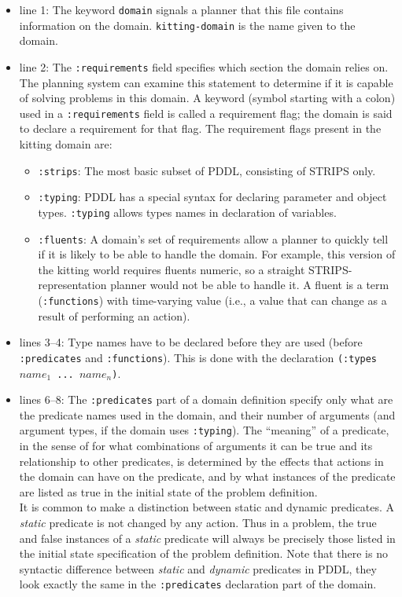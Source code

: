 \begin{itemize}
\item line 1: The keyword \texttt{domain} signals a planner that this file contains information on the domain. \texttt{kitting-domain} is the name given to the domain.
\item line 2: The \texttt{:requirements} field specifies which section the domain relies on. The planning system can examine this statement to determine if it is capable of solving problems in this domain. A keyword (symbol starting with a colon) used in a \texttt{:requirements} field is called a requirement flag; the domain is said to declare a requirement for that flag. The requirement flags present in the kitting domain are:
\begin{itemize}
\item \texttt{:strips}: The most basic subset of PDDL, consisting of STRIPS only.
\item \texttt{:typing}: PDDL has a special syntax for declaring parameter and object types. \texttt{:typing} allows types names in declaration of variables.
\item \texttt{:fluents}: A domain's set of requirements allow a planner to quickly tell if it is likely to be able
to handle the domain. For example, this version of the kitting world requires fluents numeric, so a straight STRIPS-representation planner would not be able to handle it. A fluent is a term (\texttt{:functions}) with time-varying value (i.e., a value that can change as a result of performing an action).
\end{itemize}
\item lines 3--4:  Type names have to be declared before they are used (before \texttt{:predicates} and \texttt{:functions}). This is done with the declaration \texttt{(:types $name_1$ ... $name_n$)}.
\item lines 6--8: The \texttt{:predicates} part of a domain definition specify only what are the predicate names used in the domain, and their number of arguments (and argument types, if the domain uses \texttt{:typing}). The ``meaning'' of a predicate, in the sense of for what combinations of arguments it can be true and its relationship to other predicates, is determined by the effects that actions in the domain can have on the predicate, and by what instances of the predicate are listed as true in the initial state of the problem definition.\\
    It is common to make a distinction between static and dynamic predicates. A \textit{static} predicate is not changed by any action. Thus in a problem, the true and false instances of a \textit{static} predicate will always be precisely those listed in the initial state specification of the problem definition. Note that there is no syntactic difference between \textit{static} and \textit{dynamic} predicates in PDDL, they look exactly the same in the \texttt{:predicates} declaration part of the domain.\\

\end{itemize}
